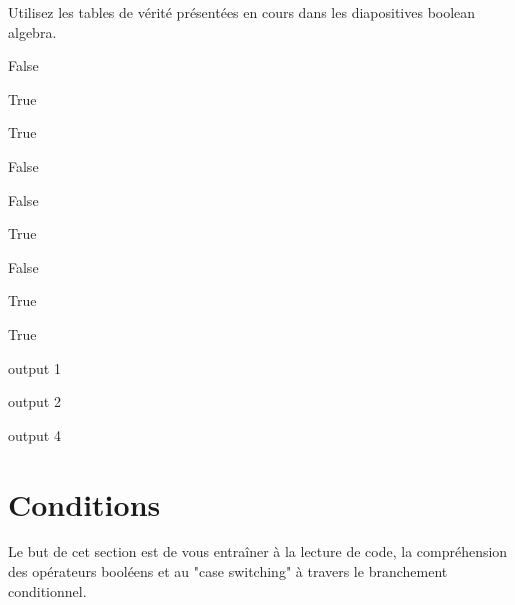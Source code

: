 \begin{conseil}
	Utilisez les tables de vérité présentées en cours dans les diapositives boolean algebra.
\end{conseil}


\begin{Exercice}[5 minutes] 
    
    

    \begin{solution}
        False 
        
        True 
        
        True 
        
        False 
        
        False \\
    \end{solution}
\end{Exercice}
    
\begin{Exercice}[5 minutes] 
    
    

    \begin{solution}
        True 
        
        False 
        
        True 
        
        True \\
    \end{solution}
    
\end{Exercice}
    
\begin{Exercice}[5 minutes] 
    
    

    \begin{solution}
        output 1 
        
        output 2 
        
        output 4 \\
    \end{solution}
    
\end{Exercice}

\newpage
\section{Conditions}
Le but de cet section est de vous entraîner à la lecture de code, la compréhension des opérateurs booléens et au "case switching" à travers le branchement conditionnel.

